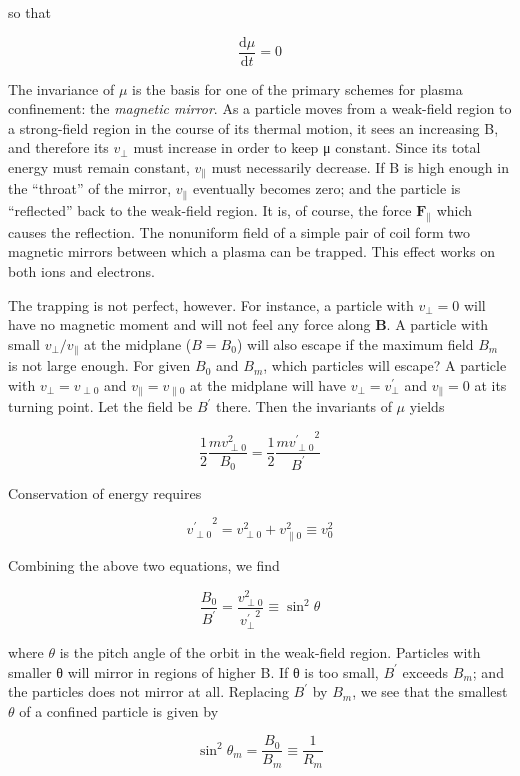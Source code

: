 \documentclass[
  notoc %
]{tufte-book}
\begin{document}
so that

\[
\frac{\mathrm{d}\mu}{\mathrm{d}t} = 0
\]

The invariance of \(\mu\) is the basis for one of the primary schemes
for plasma confinement: the \emph{magnetic mirror}. As a particle moves
from a weak-field region to a strong-field region in the course of its
thermal motion, it sees an increasing B, and therefore its \(v_\perp\)
must increase in order to keep μ constant. Since its total energy must
remain constant, \(v_\parallel\) must necessarily decrease. If B is high
enough in the ``throat'' of the mirror, \(v_\parallel\) eventually
becomes zero; and the particle is ``reflected'' back to the weak-field
region. It is, of course, the force \(\mathbf{F}_\parallel\) which
causes the reflection. The nonuniform field of a simple pair of coil
form two magnetic mirrors between which a plasma can be trapped. This
effect works on both ions and electrons.

The trapping is not perfect, however. For instance, a particle with
\(v_\perp = 0\) will have no magnetic moment and will not feel any force
along \(\mathbf{B}\). A particle with small \(v_\perp / v_\parallel\) at
the midplane (\(B = B_0\)) will also escape if the maximum field \(B_m\)
is not large enough. For given \(B_0\) and \(B_m\), which particles will
escape? A particle with \(v_\perp = v_{\perp 0}\) and
\(v_\parallel = v_{\parallel 0}\) at the midplane will have
\(v_\perp = v_\perp^\prime\) and \(v_\parallel = 0\) at its turning
point. Let the field be \(B^\prime\) there. Then the invariants of
\(\mu\) yields

\[
\frac{1}{2}\frac{mv_{\perp 0}^2}{B_0} = \frac{1}{2}\frac{m{v_{\perp 0}^{\prime}}^2}{B^\prime}
\]

Conservation of energy requires

\[
{v_{\perp 0}^{\prime}}^2 = v_{\perp 0}^2 + v_{\parallel 0}^2 \equiv v_0^2
\]

Combining the above two equations, we find

\[
\frac{B_0}{B^\prime} = \frac{v_{\perp 0}^2}{{v_{\perp}^{\prime}}^2} \equiv \sin^2 \theta
\]

where \(\theta\) is the pitch angle of the orbit in the weak-field
region. Particles with smaller θ will mirror in regions of higher B. If
θ is too small, \(B^\prime\) exceeds \(B_m\); and the particles does not
mirror at all. Replacing \(B^\prime\) by \(B_m\), we see that the
smallest \(\theta\) of a confined particle is given by

\[
\sin^2 \theta_m = \frac{B_0}{B_m} \equiv \frac{1}{R_m}
\]
\end{document}

